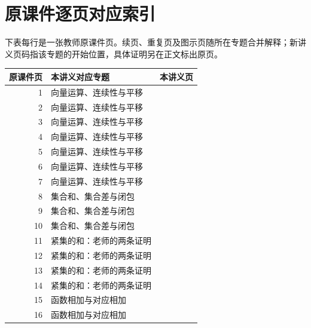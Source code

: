 \clearpage\section{原课件逐页对应索引}

下表每行是一张教师原课件页。续页、重复页及图示页随所在专题合并解释；新讲义页码指该专题的开始位置，具体证明另在正文标出原页。

\begin{longtable}{r p{.66\linewidth} r}\toprule 原课件页&本讲义对应专题&本讲义页\\\midrule\endhead

1 & 向量运算、连续性与平移 & \pageref{g:109:1}\\

2 & 向量运算、连续性与平移 & \pageref{g:109:1}\\

3 & 向量运算、连续性与平移 & \pageref{g:109:1}\\

4 & 向量运算、连续性与平移 & \pageref{g:109:1}\\

5 & 向量运算、连续性与平移 & \pageref{g:109:1}\\

6 & 向量运算、连续性与平移 & \pageref{g:109:1}\\

7 & 向量运算、连续性与平移 & \pageref{g:109:1}\\

8 & 集合和、集合差与闭包 & \pageref{g:109:8}\\

9 & 集合和、集合差与闭包 & \pageref{g:109:8}\\

10 & 集合和、集合差与闭包 & \pageref{g:109:8}\\

11 & 紧集的和：老师的两条证明 & \pageref{g:109:11}\\

12 & 紧集的和：老师的两条证明 & \pageref{g:109:11}\\

13 & 紧集的和：老师的两条证明 & \pageref{g:109:11}\\

14 & 紧集的和：老师的两条证明 & \pageref{g:109:11}\\

15 & 函数相加与对应相加 & \pageref{g:109:15}\\

16 & 函数相加与对应相加 & \pageref{g:109:15}\\


\end{longtable}
